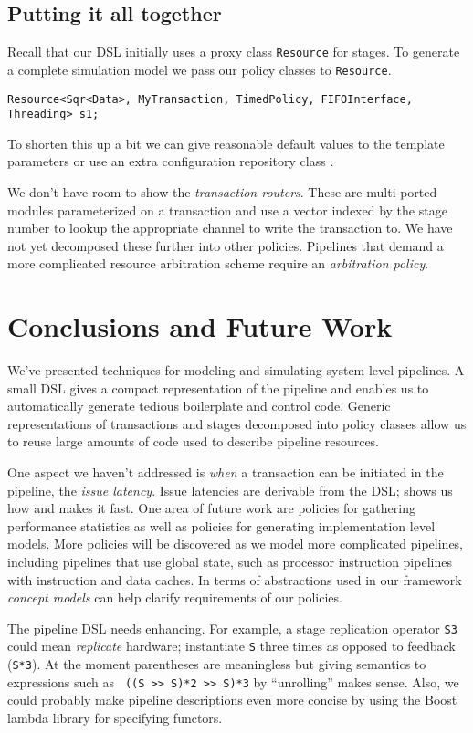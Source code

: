 \documentclass{entcs}
\begin{document}
\subsection{Putting it all together}
Recall that our DSL initially uses a proxy class {\tt Resource} for stages.
To generate a complete simulation model we pass our policy classes to {\tt Resource}.
\begin{verbatim}
Resource<Sqr<Data>, MyTransaction, TimedPolicy, FIFOInterface, Threading> s1;
\end{verbatim}
To shorten this up a bit we can give reasonable default values to the template parameters or use
an extra configuration repository class \cite{Czarnecki}.

We don't have room to show the {\em transaction routers}. These are multi-ported
modules parameterized on a transaction and use a vector indexed by the stage number
to lookup the appropriate channel to write the transaction to. We have not yet decomposed these
further into other policies. Pipelines that demand a more complicated resource arbitration
scheme require an {\em arbitration policy}.

\section{Conclusions and Future Work}
We've presented techniques for modeling and simulating system level pipelines. A small DSL
gives a compact representation of the pipeline and enables us to automatically
generate tedious boilerplate and control code. Generic representations of transactions and stages
decomposed into policy classes allow us to reuse large amounts of code used to describe pipeline
resources.

One aspect we haven't addressed is {\em when} a transaction can be initiated in the pipeline, the
{\em issue latency}. Issue latencies are derivable from the DSL; \cite{kogge81} shows us how and
\cite{Proebsting94} makes it fast. One area of future work are policies for gathering
performance statistics as well as policies for generating implementation level models. More
policies will be discovered as we model more complicated pipelines, including pipelines
that use global state, such as processor instruction pipelines with instruction and data caches.
In terms of abstractions used in our framework {\em concept models}
\cite{concepts} can help clarify requirements of our policies.

The pipeline DSL needs enhancing. For example, a stage replication
operator {\tt S3} could mean {\em
replicate} hardware; instantiate {\tt S} three times as
opposed to feedback ({\tt S*3}). At the moment parentheses are
meaningless but giving semantics to expressions such as {\tt
((S >> S)*2 >> S)*3} by ``unrolling'' makes sense.
Also, we could probably make pipeline descriptions even more
concise by using the Boost lambda library \cite{boostlambda} for
specifying functors.



\end{document}
